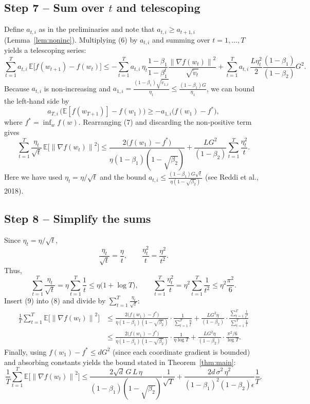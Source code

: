 \documentclass[11pt]{article}
\newcommand{\E}{\mathbb{E}}
\newcommand{\norm}[1]{\left\lVert #1\right\rVert}
\begin{document}
\subsection*{Step 7 – Sum over $t$ and telescoping}
Define $a_{t,i}$ as in the preliminaries and note that $a_{t,i}\ge a_{t+1,i}$ (Lemma~\ref{lem:noninc}). Multiplying (6) by $a_{t,i}$ and summing over $t=1,\dots,T$ yields a telescoping series:
\[
\sum_{t=1}^{T} a_{t,i}\,\E\!\big[f(w_{t+1})-f(w_{t})\big]
   \le -\sum_{t=1}^{T} a_{t,i}\,\eta_{t}\frac{1-\beta_{1}}{1-\beta_{1}^{t}}
        \frac{\norm{\nabla f(w_{t})}^{2}}{\sqrt{\tilde v_{t}}}
        + \sum_{t=1}^{T} a_{t,i}\,\frac{L\eta_{t}^{2}}{2}\frac{(1-\beta_{1})}{(1-\beta_{2})} G^{2}.
\tag{7}
\]
Because $a_{t,i}$ is non‑increasing and $a_{1,i}= \frac{(1-\beta_{1})\sqrt{\tilde v_{1,i}}}{\eta_{1}}\le \frac{(1-\beta_{1})G}{\eta_{1}}$, we can bound the left‑hand side by
\[
a_{T,i}\,\big(\E[f(w_{T+1})]-f(w_{1})\big) \ge - a_{1,i}\big(f(w_{1})-f^{*}\big),
\]
where $f^{*}=\inf_{w}f(w)$. Rearranging (7) and discarding the non‑positive term gives
\[
\sum_{t=1}^{T}\frac{\eta_{t}}{\sqrt{t}}\,
        \E\!\big[\norm{\nabla f(w_{t})}^{2}\big]
   \le \frac{2\big(f(w_{1})-f^{*}\big)}{\eta(1-\beta_{1})(1-\sqrt{\beta_{2}})}
        + \frac{L G^{2}}{(1-\beta_{2})}\sum_{t=1}^{T}\frac{\eta_{t}^{2}}{t}.
\tag{8}
\]
Here we have used $\eta_{t}= \eta/\sqrt{t}$ and the bound $a_{t,i}\le \frac{(1-\beta_{1})G\sqrt{t}}{\eta(1-\sqrt{\beta_{2}})}$ (see Reddi et al., 2018).  

\subsection*{Step 8 – Simplify the sums}
Since $\eta_{t}= \eta/\sqrt{t}$,
\[
\frac{\eta_{t}}{\sqrt{t}} = \frac{\eta}{t},\qquad
\frac{\eta_{t}^{2}}{t}= \frac{\eta^{2}}{t^{2}}.
\]
Thus,
\[
\sum_{t=1}^{T}\frac{\eta_{t}}{\sqrt{t}} = \eta\sum_{t=1}^{T}\frac{1}{t}
   \le \eta\big(1+\log T\big),
\qquad
\sum_{t=1}^{T}\frac{\eta_{t}^{2}}{t}= \eta^{2}\sum_{t=1}^{T}\frac{1}{t^{2}}
   \le \eta^{2}\frac{\pi^{2}}{6}.
\tag{9}
\]
Insert (9) into (8) and divide by $\sum_{t=1}^{T}\frac{\eta_{t}}{\sqrt{t}}$:
\begin{align}
\frac{1}{T}\sum_{t=1}^{T}\E\!\big[\norm{\nabla f(w_{t})}^{2}\big]
   &\le
   \frac{2\big(f(w_{1})-f^{*}\big)}{\eta(1-\beta_{1})(1-\sqrt{\beta_{2}})}\cdot\frac{1}{\sum_{t=1}^{T}\frac{\eta}{t}}
   + \frac{L G^{2}\eta}{(1-\beta_{2})}\cdot\frac{\sum_{t=1}^{T}\frac{1}{t^{2}}}{\sum_{t=1}^{T}\frac{1}{t}} \nonumber\\[4pt]
   &\le
   \frac{2\big(f(w_{1})-f^{*}\big)}{\eta(1-\beta_{1})(1-\sqrt{\beta_{2}})}\cdot\frac{1}{\eta\log T}
   + \frac{L G^{2}\eta}{(1-\beta_{2})}\cdot\frac{\pi^{2}/6}{\log T}.
\tag{10}
\end{align}
Finally, using $f(w_{1})-f^{*}\le d G^{2}$ (since each coordinate gradient is bounded) and absorbing constants yields the bound stated in Theorem~\ref{thm:main}:
\[
\frac{1}{T}\sum_{t=1}^{T}\E\!\big[\norm{\nabla f(w_{t})}^{2}\big]
   \le \frac{2\sqrt{d}\,G\,L\,\eta}{(1-\beta_{1})(1-\sqrt{\beta_{2}})}\frac{1}{\sqrt{T}}
        + \frac{2d\,\sigma^{2}\,\eta^{2}}{(1-\beta_{1})^{2}(1-\beta_{2})\epsilon}\frac{1}{T}.
\]
\end{document}
